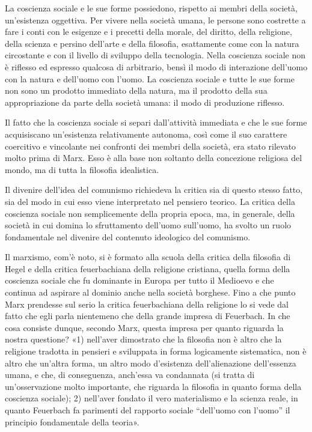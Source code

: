\documentclass[12pt,a4paper,openany]{book}
\begin{document}
La coscienza sociale e le sue forme possiedono, rispetto ai membri della società, un'esistenza oggettiva. Per vivere nella società umana, le persone sono costrette a fare i conti con le esigenze e i precetti della morale, del diritto, della religione, della scienza e persino dell'arte e della filosofia, esattamente come con la natura circostante e con il livello di sviluppo della tecnologia. Nella coscienza sociale non è riflesso ed espresso qualcosa di arbitrario, bensì il modo di interazione dell'uomo con la natura e dell'uomo con l'uomo. La coscienza sociale e tutte le sue forme non sono un prodotto immediato della natura, ma il prodotto della sua appropriazione da parte della società umana: il modo di produzione riflesso.

Il fatto che la coscienza sociale si separi dall'attività immediata e che le sue forme acquisiscano un'esistenza relativamente autonoma, così come il suo carattere coercitivo e vincolante nei confronti dei membri della società, era stato rilevato molto prima di Marx. Esso è alla base non soltanto della concezione religiosa del mondo, ma di tutta la filosofia idealistica.

Il divenire dell'idea del comunismo richiedeva la critica sia di questo stesso fatto, sia del modo in cui esso viene interpretato nel pensiero teorico. La critica della coscienza sociale non semplicemente della propria epoca, ma, in generale, della società in cui domina lo sfruttamento dell'uomo sull'uomo, ha svolto un ruolo fondamentale nel divenire del contenuto ideologico del comunismo.

Il marxismo, com'è noto, si è formato alla scuola della critica della filosofia di Hegel e della critica feuerbachiana della religione cristiana, quella forma della coscienza sociale che fu dominante in Europa per tutto il Medioevo e che continua ad aspirare al dominio anche nella società borghese. Fino a che punto Marx prendesse sul serio la critica feuerbachiana della religione lo si vede dal fatto che egli parla nientemeno che della grande impresa di Feuerbach. In che cosa consiste dunque, secondo Marx, questa impresa per quanto riguarda la nostra questione? «1) nell'aver dimostrato che la filosofia non è altro che la religione tradotta in pensieri e sviluppata in forma logicamente sistematica, non è altro che un'altra forma, un altro modo d'esistenza dell'alienazione dell'essenza umana, e che, di conseguenza, anch'essa va condannata (si tratta di un'osservazione molto importante, che riguarda la filosofia in quanto forma della coscienza sociale); 2) nell'aver fondato il vero materialismo e la scienza reale, in quanto Feuerbach fa parimenti del rapporto sociale “dell'uomo con l'uomo” il principio fondamentale della teoria».
\end{document}
